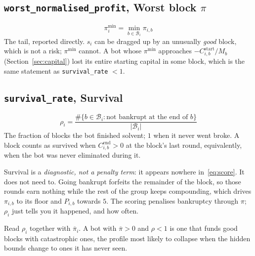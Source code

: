 \documentclass[11pt,a4paper]{article}
\newcommand{\code}[1]{\texttt{\small #1}}
\begin{document}
\subsection{\code{worst\_normalised\_profit}, Worst block \texorpdfstring{$\pi$}{pi}}
\begin{equation}
  \pi^{\min}_i = \min_{b \in \mathcal{B}_i} \pi_{i,b}
\end{equation}
The tail, reported directly. $s_i$ can be dragged up by an unusually
\emph{good} block, which is not a risk; $\pi^{\min}$ cannot. A bot whose
$\pi^{\min}$ approaches $-C^{\text{start}}_{i,b}/M_b$
(Section~\ref{sec:capital}) lost its entire starting capital in some block,
which is the same statement as \code{survival\_rate} $< 1$.

\subsection{\code{survival\_rate}, Survival}
\label{sec:survival}
\begin{equation}
  \boxed{\;
  \rho_i = \frac{\#\{b \in \mathcal{B}_i : \text{not bankrupt at the end of } b\}}
                {|\mathcal{B}_i|}
  \;}
\end{equation}
The fraction of blocks the bot finished solvent; $1$ when it never went broke.
A block counts as survived when $C^{\text{end}}_{i,b} > 0$ at the block's last
round, equivalently, when the bot was never eliminated during it.

Survival is a \emph{diagnostic, not a penalty term}: it appears nowhere
in~\eqref{eq:score}. It does not need to. Going bankrupt forfeits the remainder
of the block, so those rounds earn nothing while the rest of the group keeps
compounding, which drives $\pi_{i,b}$ to its floor and $P_{i,b}$ towards $5$.
The scoring penalises bankruptcy through $\pi$; $\rho_i$ just tells you it
happened, and how often.

Read $\rho_i$ together with $\overline{\pi}_i$. A bot with $\overline{\pi} > 0$
and $\rho < 1$ is one that funds good blocks with catastrophic ones, the
profile most likely to collapse when the hidden bounds change to ones it has
never seen.
\end{document}
